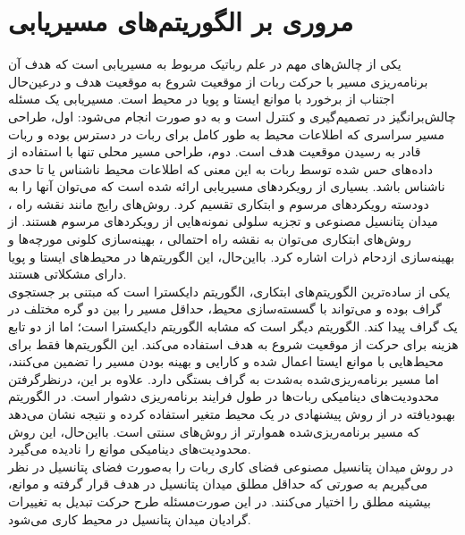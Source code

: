 \section{مروری بر الگوریتم‌های مسیریابی}\label{مروری بر الگوریتم‌های مسیریابی}
یکی از چالش‌های مهم در علم رباتیک مربوط به مسیریابی است که هدف آن برنامه‌ریزی مسیر با حرکت ربات از موقعیت شروع به موقعیت هدف و درعین‌حال اجتناب از برخورد با موانع ایستا
\noindent\unskip{}
و پویا
\noindent\unskip{}
در محیط است. مسیریابی یک مسئله چالش‌برانگیز در  تصمیم‌گیری و کنترل است و به دو صورت انجام می‌شود: اول، طراحی مسیر سراسری که اطلاعات محیط به طور کامل برای ربات در دسترس بوده و ربات قادر به رسیدن موقعیت هدف است. دوم، طراحی مسیر محلی تنها با استفاده از داده‌های حس شده توسط ربات به این معنی که اطلاعات محیط ناشناس یا تا حدی ناشناس باشد.
بسیاری از رویکردهای مسیریابی ارائه شده است که می‌توان آنها را به دودسته رویکردهای مرسوم
\noindent\unskip{}
و ابتکاری
\noindent\unskip{}
تقسیم کرد. روش‌های رایج مانند نقشه راه
\noindent\unskip{}،
میدان پتانسیل مصنوعی
\noindent\unskip{}
و تجزیه سلولی
\noindent\unskip{}
نمونه‌هایی از رویکردهای مرسوم هستند.
از روش‌های ابتکاری می‌توان به نقشه راه احتمالی
\noindent\unskip{}،
بهینه‌سازی کلونی مورچه‌ها
\noindent\unskip{}
و بهینه‌سازی ازدحام ذرات 
\noindent\unskip{}
اشاره کرد.
بااین‌حال، این الگوریتم‌ها در محیط‌های ایستا و پویا دارای مشکلاتی هستند.
\\
یکی از ساده‌ترین الگوریتم‌های ابتکاری، الگوریتم دایکسترا
\noindent\unskip{}
است که مبتنی بر جستجوی گراف بوده و می‌تواند با گسسته‌سازی محیط، حداقل مسیر را بین دو گره مختلف در یک گراف پیدا کند. 
الگوریتم دیگر
است که مشابه الگوریتم دایکسترا
است؛ اما از دو تابع هزینه برای حرکت از موقعیت شروع به هدف استفاده می‌کند.
این الگوریتم‌ها فقط برای محیط‌هایی با موانع ایستا اعمال شده و کارایی و بهینه بودن مسیر را تضمین می‌کنند، اما مسیر برنامه‌ریزی‌شده به‌شدت به گراف بستگی دارد. علاوه بر این، درنظرگرفتن محدودیت‌های دینامیکی ربات‌ها در طول فرایند برنامه‌ریزی دشوار است.
در الگوریتم بهبودیافته
در 
\cite{sipahioglu2008real}
از روش پیشنهادی در یک محیط متغیر استفاده کرده و نتیجه نشان می‌دهد که مسیر برنامه‌ریزی‌شده هموارتر از روش‌های سنتی است. بااین‌حال، این روش محدودیت‌های دینامیکی موانع را نادیده می‌گیرد.
\\
در روش‌ میدان پتانسیل مصنوعی فضای کاری ربات را به‌صورت فضای پتانسیل در نظر می‌گیریم به صورتی که حداقل مطلق میدان پتانسیل در هدف قرار گرفته و موانع، بیشینه مطلق را اختیار می‌کنند. در این صورت‌مسئله طرح حرکت تبدیل به تغییرات گرادیان میدان پتانسیل در محیط کاری می‌شود.
